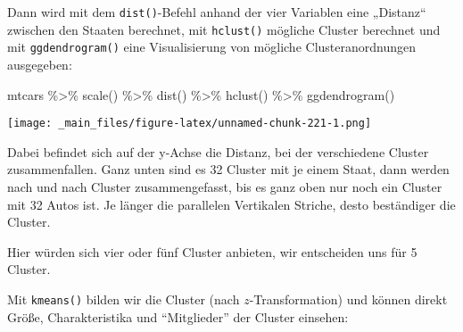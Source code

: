 \documentclass[
  ngerman,
]{article}
\newenvironment{Shaded}{\begin{snugshade}}{\end{snugshade}}
\newcommand{\FunctionTok}[1]{\textcolor[rgb]{0.00,0.00,0.00}{#1}}
\newcommand{\NormalTok}[1]{#1}
\newcommand{\SpecialCharTok}[1]{\textcolor[rgb]{0.00,0.00,0.00}{#1}}
\begin{document}
Dann wird mit dem \texttt{dist()}-Befehl anhand der vier Variablen eine „Distanz`` zwischen den Staaten berechnet, mit \texttt{hclust()} mögliche Cluster berechnet und mit \texttt{ggdendrogram()} eine Visualisierung von mögliche Clusteranordnungen ausgegeben:

\begin{Shaded}
\begin{Highlighting}[]
\NormalTok{mtcars }\SpecialCharTok{\%\textgreater{}\%}
  \FunctionTok{scale}\NormalTok{() }\SpecialCharTok{\%\textgreater{}\%}
  \FunctionTok{dist}\NormalTok{() }\SpecialCharTok{\%\textgreater{}\%}
  \FunctionTok{hclust}\NormalTok{() }\SpecialCharTok{\%\textgreater{}\%}
  \FunctionTok{ggdendrogram}\NormalTok{()}
\end{Highlighting}
\end{Shaded}

\texttt{[image: \_main\_files/figure-latex/unnamed-chunk-221-1.png]}

Dabei befindet sich auf der y-Achse die Distanz, bei der verschiedene Cluster zusammenfallen. Ganz unten sind es 32 Cluster mit je einem Staat, dann werden nach und nach Cluster zusammengefasst, bis es ganz oben nur noch ein Cluster mit 32 Autos ist. Je länger die parallelen Vertikalen Striche, desto beständiger die Cluster.

Hier würden sich vier oder fünf Cluster anbieten, wir entscheiden uns für 5 Cluster.

Mit \texttt{kmeans()} bilden wir die Cluster (nach \(z\)-Transformation) und können direkt Größe, Charakteristika und ``Mitglieder'' der Cluster einsehen:
\end{document}
